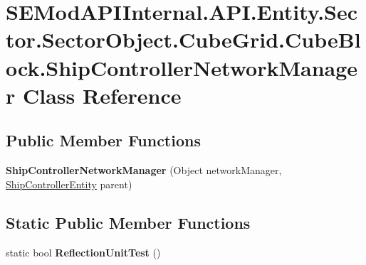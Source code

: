 \hypertarget{class_s_e_mod_a_p_i_internal_1_1_a_p_i_1_1_entity_1_1_sector_1_1_sector_object_1_1_cube_grid_1_10d30164bdccb131dcc67927f77b8ef67}{}\section{S\+E\+Mod\+A\+P\+I\+Internal.\+A\+P\+I.\+Entity.\+Sector.\+Sector\+Object.\+Cube\+Grid.\+Cube\+Block.\+Ship\+Controller\+Network\+Manager Class Reference}
\label{class_s_e_mod_a_p_i_internal_1_1_a_p_i_1_1_entity_1_1_sector_1_1_sector_object_1_1_cube_grid_1_10d30164bdccb131dcc67927f77b8ef67}
\subsection*{Public Member Functions}
\begin{DoxyCompactItemize}
\item 
\hypertarget{class_s_e_mod_a_p_i_internal_1_1_a_p_i_1_1_entity_1_1_sector_1_1_sector_object_1_1_cube_grid_1_10d30164bdccb131dcc67927f77b8ef67_a572d1471b7e75957debd5084f7cf6cc8}{}{\bfseries Ship\+Controller\+Network\+Manager} (Object network\+Manager, \hyperlink{class_s_e_mod_a_p_i_internal_1_1_a_p_i_1_1_entity_1_1_sector_1_1_sector_object_1_1_cube_grid_1_1fd05c9636f75dd22094d44c0d12591d7}{Ship\+Controller\+Entity} parent)\label{class_s_e_mod_a_p_i_internal_1_1_a_p_i_1_1_entity_1_1_sector_1_1_sector_object_1_1_cube_grid_1_10d30164bdccb131dcc67927f77b8ef67_a572d1471b7e75957debd5084f7cf6cc8}

\end{DoxyCompactItemize}
\subsection*{Static Public Member Functions}
\begin{DoxyCompactItemize}
\item 
\hypertarget{class_s_e_mod_a_p_i_internal_1_1_a_p_i_1_1_entity_1_1_sector_1_1_sector_object_1_1_cube_grid_1_10d30164bdccb131dcc67927f77b8ef67_a225c0b8915a646b7b74c90749c1abd10}{}static bool {\bfseries Reflection\+Unit\+Test} ()\label{class_s_e_mod_a_p_i_internal_1_1_a_p_i_1_1_entity_1_1_sector_1_1_sector_object_1_1_cube_grid_1_10d30164bdccb131dcc67927f77b8ef67_a225c0b8915a646b7b74c90749c1abd10}

\end{DoxyCompactItemize}

